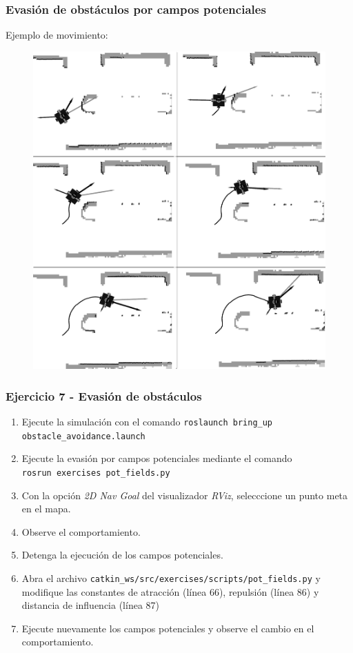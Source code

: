 \begin{frame}\frametitle{Evasión de obstáculos por campos potenciales}
  Ejemplo de movimiento:
  \begin{figure}
    \centering
    \includegraphics[height=0.85\textheight]{Figures/PotFieldsExecution.png}
  \end{figure}
\end{frame}

\begin{frame}[containsverbatim]\frametitle{Ejercicio 7 - Evasión de obstáculos}
  \begin{enumerate}
  \item Ejecute la simulación con el comando \texttt{roslaunch bring\_up obstacle\_avoidance.launch}
  \item Ejecute la evasión por campos potenciales mediante el comando\\ \texttt{rosrun exercises pot\_fields.py}
  \item Con la opción \textit{2D Nav Goal} del visualizador \textit{RViz}, selecccione un punto meta en el mapa.
  \item Observe el comportamiento.
  \item Detenga la ejecución de los campos potenciales. 
  \item Abra el archivo \texttt{catkin\_ws/src/exercises/scripts/pot\_fields.py} y modifique las constantes de atracción (línea 66), repulsión (línea 86) y distancia de influencia (línea 87)
  \item Ejecute nuevamente los campos potenciales y observe el cambio en el comportamiento.
  \end{enumerate}
\end{frame}

